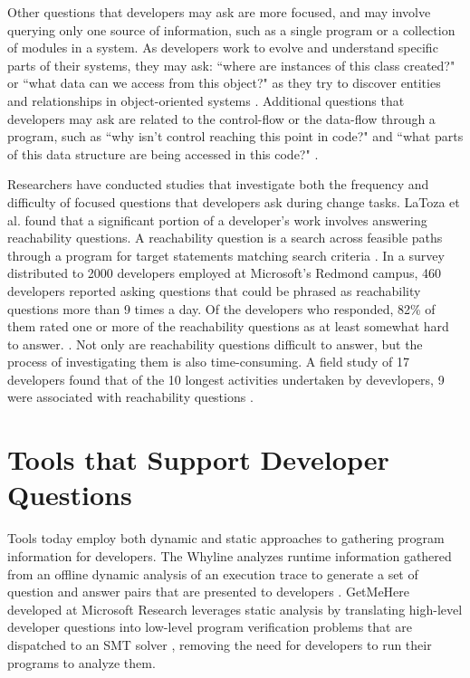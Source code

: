 \par Other questions that developers may ask are more focused, and may involve
querying only one source of information, such as a single program or a
collection of modules in a system.
As developers work to evolve and understand specific parts of their systems,
they may ask: ``where are instances of this class created?" or
``what data can we access from this object?" as they try to discover entities
and relationships in object-oriented systems
\cite{sillito-2006-questions-during-task}.
Additional questions that developers may ask are related to 
the control-flow or the data-flow through a program, such as 
``why isn't control reaching this point in code?" and 
``what parts of this data structure are being accessed in this code?" 
\cite{sillito-2006-questions-during-task}.

\par Researchers have conducted studies that investigate both the 
frequency and difficulty of focused questions that developers ask during 
change tasks.
LaToza et al. found that a significant portion of a developer's work involves 
answering reachability questions.
A reachability question is a search across feasible paths through a program for 
target statements matching search criteria \cite{latoza-2010-reach}.
In a survey distributed to 2000 developers employed at Microsoft's Redmond
campus, 460 developers reported asking questions that could be phrased as 
reachability questions more than 9 times a day.
Of the developers who responded, 82\% of them rated one or more of the
reachability questions as at least somewhat hard to answer.
\cite{latoza-2010-reach}.
Not only are reachability questions difficult to answer, but the process of
investigating them is also time-consuming.
A field study of 17 developers found that of the 10 longest activities
undertaken by devevlopers, 9 were associated with reachability questions
\cite{latoza-2010-reach}.

\section{Tools that Support Developer Questions}
\label{sec:ToolsSupportDeveloperQuestions}

\noindent Tools today employ both dynamic and static approaches to gathering
program information for developers.
The Whyline analyzes runtime information gathered from an offline dynamic
analysis of an execution trace to generate a set of question and answer pairs
that are presented to developers \cite{ko-2004-whyline}.
GetMeHere developed at Microsoft Research leverages static analysis by
translating high-level developer questions into low-level program verification 
problems that are dispatched to an \ac{SMT} solver \cite{barnett-2014-get}, 
removing the need for developers to run their programs to analyze them.

